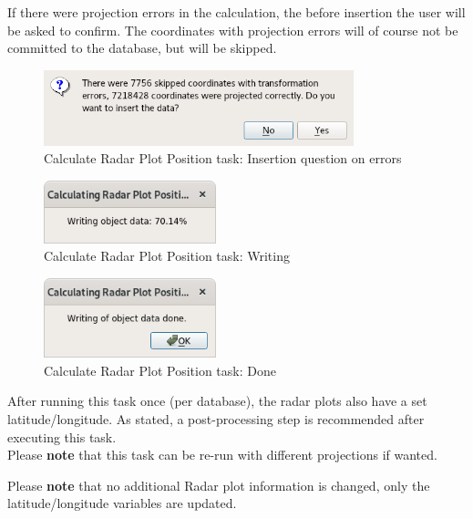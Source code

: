 If there were projection errors in the calculation, the before insertion the user will be asked to confirm. The coordinates with projection errors will of course not be committed to the database, but will be skipped.

\begin{figure}[H]
  \center
    \includegraphics[width=9cm,frame]{figures/task_calc_radar_insert.png}
  \caption{Calculate Radar Plot Position task: Insertion question on errors}
\end{figure}


\begin{figure}[H]
  \center
    \includegraphics[width=5cm]{figures/task_calc_radar_write.png}
  \caption{Calculate Radar Plot Position task: Writing}
\end{figure}

\begin{figure}[H]
  \center
    \includegraphics[width=5cm]{figures/task_calc_radar_done.png}
  \caption{Calculate Radar Plot Position task: Done}
\end{figure}

After running this task once (per database), the radar plots also have a set latitude/longitude. As stated, a post-processing step is recommended after executing this task. \\

Please \textbf{note} that this task can be re-run with different projections if wanted.

Please \textbf{note} that no additional Radar plot information is changed, only the latitude/longitude variables are updated. 
